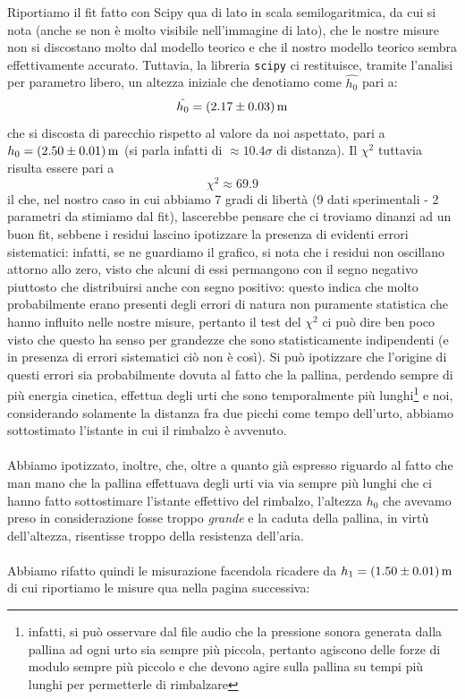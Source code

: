 \documentclass{article}
\begin{document}
\noindent Riportiamo il fit fatto con Scipy qua di lato in scala semilogaritmica, da cui si nota (anche se non è molto visibile nell'immagine di lato), che le nostre misure non si discostano molto dal modello teorico e che il nostro modello teorico sembra effettivamente accurato. Tuttavia, la libreria \texttt{scipy} ci restituisce, tramite l'analisi per parametro libero, un altezza iniziale che denotiamo come $\hat{h_0}$ pari a:
\begin{equation}
	\hat{h_0} = (2.17 \pm 0.03) \, \text{\unit{m}}
\end{equation}
che si discosta di parecchio rispetto al valore da noi aspettato, pari a $h_0 = (2.50 \pm 0.01) \, \text{\unit{m}}$ (si parla infatti di $\approx 10.4\sigma$ di distanza). Il $\chi^2$ tuttavia risulta essere pari a
\begin{equation}
	\chi^2 \approx 69.9
\end{equation}
il che, nel nostro caso in cui abbiamo 7 gradi di libertà (9 dati sperimentali - 2 parametri da stimiamo dal fit), lascerebbe pensare che ci troviamo dinanzi ad un buon fit, sebbene i residui lascino ipotizzare la presenza di evidenti errori sistematici: infatti, se ne guardiamo il grafico, si nota che i residui non oscillano attorno allo zero, visto che alcuni di essi permangono con il segno negativo piuttosto che distribuirsi anche con segno positivo: questo indica che molto probabilmente erano presenti degli errori di natura non puramente statistica che hanno influito nelle nostre misure, pertanto il test del $\chi^2$ ci può dire ben poco visto che questo ha senso per grandezze che sono statisticamente indipendenti (e in presenza di errori sistematici ciò non è così). Si può ipotizzare che l'origine di questi errori sia probabilmente dovuta al fatto che la pallina, perdendo sempre di più energia cinetica, effettua degli urti che sono temporalmente più lunghi\footnote{infatti, si può osservare dal file audio che la pressione sonora generata dalla pallina ad ogni urto sia sempre più piccola, pertanto agiscono delle forze di modulo sempre più piccolo e che devono agire sulla pallina su tempi più lunghi per permetterle di rimbalzare} e noi, considerando solamente la distanza fra due picchi come tempo dell'urto, abbiamo sottostimato l'istante in cui il rimbalzo è avvenuto. \\ \\
Abbiamo ipotizzato, inoltre, che, oltre a quanto già espresso riguardo al fatto che man mano che la pallina effettuava degli urti via via sempre più lunghi che ci hanno fatto sottostimare l'istante effettivo del rimbalzo, l'altezza $h_0$ che avevamo preso in considerazione fosse troppo \emph{grande} e la caduta della pallina, in virtù dell'altezza, risentisse troppo della resistenza dell'aria. \\ \\
Abbiamo rifatto quindi le misurazione facendola ricadere da $h_1 = (1.50 \pm 0.01) \, \text{\unit{m}}$ di cui riportiamo le misure qua nella pagina successiva: 
\end{document}
